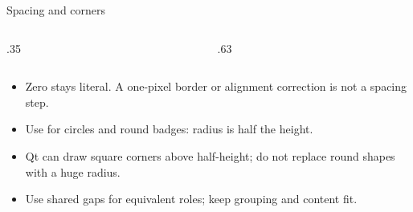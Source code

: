 \begin{standardframe}{Spacing and corners}
\begin{columns}[T,onlytextwidth]\begin{column}{.35\linewidth}
\end{column}\begin{column}{.63\linewidth}
\end{column}\end{columns}\begin{itemize}
\item Zero stays literal. A one-pixel border or alignment correction is not a spacing step.
\item Use  for circles and round badges: radius is half the height.
\item Qt can draw square corners above half-height; do not replace round shapes with a huge radius.
\item Use shared gaps for equivalent roles; keep grouping and content fit.
\end{itemize}
\end{standardframe}

